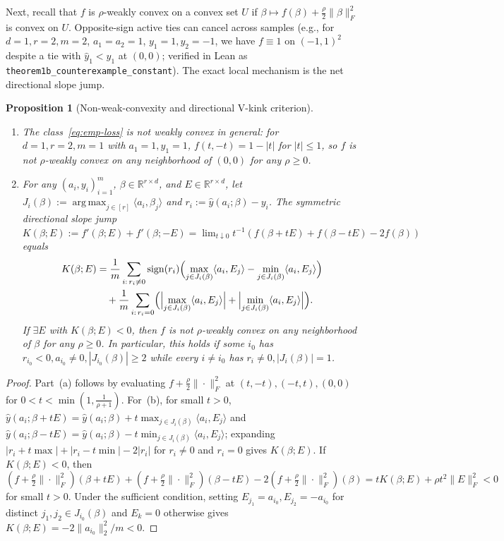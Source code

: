 \documentclass[11pt]{article}
\theoremstyle{plain}
\newtheorem{proposition}[theorem]{Proposition}
\theoremstyle{remark}
\numberwithin{equation}{section}
\newcommand{\R}{\mathbb{R}}
\newcommand{\ip}[2]{\langle #1, #2 \rangle}
\newcommand{\norm}[1]{\|#1\|}
\newcommand{\argmax}{\operatorname*{arg\,max}}
\newcommand{\sign}{\operatorname{sign}}
\newcommand{\Fnorm}[1]{\|#1\|_F}
\begin{document}
Next, recall that $f$ is $\rho$-weakly convex on a convex set $U$ if $\beta \mapsto f(\beta) + \frac{\rho}{2}\Fnorm{\beta}^2$ is convex on $U$. Opposite-sign active ties can cancel across samples (e.g., for $d = 1, r = 2, m = 2$, $a_1 = a_2 = 1$, $y_1 = 1, y_2 = -1$, we have $f \equiv 1$ on $(-1, 1)^2$ despite a tie with $\hat y_1 < y_1$ at $(0, 0)$; verified in Lean as \texttt{theorem1b\_\-counterexample\_\-constant}). The exact local mechanism is the net directional slope jump.

\begin{proposition}[Non-weak-convexity and directional V-kink criterion]
  \label{prop:non-weak-convex}
  \begin{enumerate}[label=(\alph*)]
    \item The class~\eqref{eq:emp-loss} is not weakly convex in general: for $d = 1, r = 2, m = 1$ with $a_1 = 1, y_1 = 1$, $f(t, -t) = 1 - |t|$ for $|t| \le 1$, so $f$ is not $\rho$-weakly convex on any neighborhood of $(0, 0)$ for any $\rho \ge 0$.
    \item For any $(a_i, y_i)_{i=1}^m$, $\beta \in \R^{r\times d}$, and $E \in \R^{r\times d}$, let $J_i(\beta) := \argmax_{j\in[r]}\ip{a_i}{\beta_j}$ and $r_i := \hat y(a_i; \beta) - y_i$. The symmetric directional slope jump $K(\beta; E) := f'(\beta; E) + f'(\beta; -E) = \lim_{t\downarrow 0} t^{-1}(f(\beta + tE) + f(\beta - tE) - 2f(\beta))$ equals
    \begin{align*}
      K(\beta; E) &= \frac{1}{m}\sum_{i:\, r_i \ne 0} \sign(r_i)\Bigl(\max_{j\in J_i(\beta)}\ip{a_i}{E_j} - \min_{j\in J_i(\beta)}\ip{a_i}{E_j}\Bigr) \\
      &\quad + \frac{1}{m}\sum_{i:\, r_i = 0} \Bigl(\Bigl|\max_{j\in J_i(\beta)}\ip{a_i}{E_j}\Bigr| + \Bigl|\min_{j\in J_i(\beta)}\ip{a_i}{E_j}\Bigr|\Bigr).
    \end{align*}
    If $\exists E$ with $K(\beta; E) < 0$, then $f$ is not $\rho$-weakly convex on any neighborhood of $\beta$ for any $\rho \ge 0$. In particular, this holds if some $i_0$ has $r_{i_0} < 0, a_{i_0} \ne 0, |J_{i_0}(\beta)| \ge 2$ while every $i \ne i_0$ has $r_i \ne 0, |J_i(\beta)| = 1$.
  \end{enumerate}
\end{proposition}
\begin{proof}
Part~(a) follows by evaluating $f + \frac{\rho}{2}\Fnorm{\cdot}^2$ at $(t,-t), (-t,t), (0,0)$ for $0 < t < \min(1, \frac{1}{\rho+1})$. For~(b), for small $t > 0$, $\hat y(a_i; \beta + tE) = \hat y(a_i; \beta) + t\max_{j\in J_i(\beta)}\ip{a_i}{E_j}$ and $\hat y(a_i; \beta - tE) = \hat y(a_i; \beta) - t\min_{j\in J_i(\beta)}\ip{a_i}{E_j}$; expanding $|r_i + t\max| + |r_i - t\min| - 2|r_i|$ for $r_i \ne 0$ and $r_i = 0$ gives $K(\beta; E)$. If $K(\beta; E) < 0$, then $(f + \frac{\rho}{2}\Fnorm{\cdot}^2)(\beta + tE) + (f + \frac{\rho}{2}\Fnorm{\cdot}^2)(\beta - tE) - 2(f + \frac{\rho}{2}\Fnorm{\cdot}^2)(\beta) = t K(\beta; E) + \rho t^2\Fnorm{E}^2 < 0$ for small $t > 0$. Under the sufficient condition, setting $E_{j_1} = a_{i_0}, E_{j_2} = -a_{i_0}$ for distinct $j_1, j_2 \in J_{i_0}(\beta)$ and $E_k = 0$ otherwise gives $K(\beta; E) = -2\norm{a_{i_0}}_2^2/m < 0$.
\end{proof}
\end{document}
